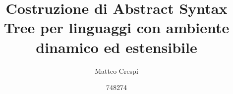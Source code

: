 \documentclass{beamer}
\title{Costruzione di Abstract Syntax Tree per linguaggi con ambiente dinamico
ed estensibile}
\subtitle{Matteo Crespi}
\author{748274}
\begin{document}
\frame{\maketitle}
\end{document}
